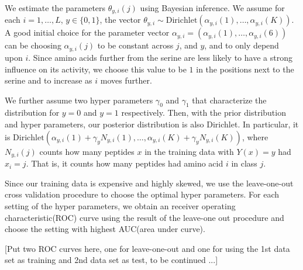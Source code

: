 \documentclass[11pt]{article}
\newcommand{\Dir}{\mathrm{Dirichlet}}
\begin{document}
We estimate the parameters $\theta_{y,i}(j)$ using Bayesian inference. We assume for each $i=1,\ldots,L$, $y\in\{0,1\}$, the vector $\theta_{y,i}\sim\Dir(\alpha_{y,i}(1),\ldots,\alpha_{y,i}(K))$. A good initial choice for the parameter vector $\alpha_{y,i} = (\alpha_{y,i}(1),\ldots,\alpha_{y,i}(6))$ can be choosing $\alpha_{y,i}(j)$ to be constant across $j$, and $y$, and to only depend upon $i$. Since amino acids further from the serine are less likely to have a strong influence on its activity, we choose this value to be $1$ in the positions next to the serine and to increase as $i$ moves further.

We further assume two hyper parameters $\gamma_0$ and $\gamma_1$ that characterize the distribution for $y=0$ and $y=1$ respectively. Then, with the prior distribution and hyper parameters, our posterior distribution is also Dirichlet. In particular, it is 
$\Dir( \alpha_{y,i}(1) + \gamma_yN_{y,i}(1), \ldots, \alpha_{y,i}(K) + \gamma_yN_{y,i}(K))$,
where $N_{y,i}(j)$ counts how many peptides $x$ in the training data with $Y(x)=y$ had $x_i=j$.  That is, it counts how many peptides had amino acid $i$ in class $j$.

Since our training data is expensive and highly skewed, we use the leave-one-out cross validation procedure to choose the optimal hyper parameters. For each setting of the hyper parameters, we obtain an receiver operating characteristic(ROC) curve using the result of the leave-one out procedure and choose the setting with highest AUC(area under curve).

[Put two ROC curves here, one for leave-one-out and one for using the 1st data set as training and 2nd data set as test, to be continued ...]
\end{document}
